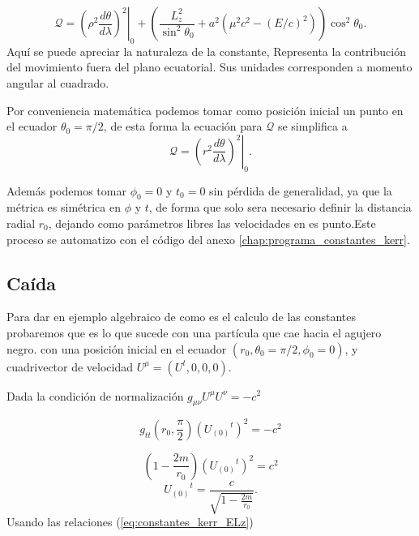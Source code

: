 \begin{equation}
    \mathcal{Q}=\left.\left(\rho^2 \frac{d \theta}{d \lambda}\right)^2\right|_0 +\left(\frac{L_z^2}{\sin ^2 \theta_0}+a^2\left(\mu^2 c^2-(E/c)^2\right)\right) \cos ^2 \theta_0 .
\end{equation}
Aquí se puede apreciar la naturaleza de la constante, Representa la contribución del movimiento fuera del plano ecuatorial. Sus unidades corresponden a momento angular al cuadrado.

Por conveniencia matemática podemos tomar como posición inicial un punto en el ecuador $\theta_0=\pi / 2$, de esta forma la ecuación para $\mathcal{Q}$ se simplifica a
\begin{equation}
    \mathcal{Q}=\left.\left(r^2 \frac{d \theta}{d \lambda}\right)^2\right|_0  .
\end{equation}

Además podemos tomar $\phi_0=0$ y $t_0=0$ sin pérdida de generalidad, ya que la métrica es simétrica en $\phi$ y $t$, de forma que solo sera necesario definir la distancia radial $r_0$, dejando como parámetros libres las velocidades en es punto.Este proceso se automatizo con el código del anexo \ref{chap:programa_constantes_kerr}.


\subsection{Caída }
Para dar en ejemplo algebraico de como es el calculo de las constantes probaremos que es lo que sucede con una partícula que cae hacia el agujero negro. con una posición inicial en el ecuador $(r_0, \theta_0=\pi/2, \phi_0=0)$, y cuadrivector de velocidad $U^\mu = (U^t, 0, 0, 0 )$.

Dada la condición de normalización $g_{\mu \nu} U^\mu U^\nu=-c^2$

\begin{equation}
    g_{t t}\left(r_0, \frac{\pi}{2}\right)\left({U_{(0)}}^t\right)^2=-c^2
\end{equation}


\begin{equation}
    \left(1-\frac{2 m }{r_0}\right)\left({U_{(0)}}^t\right)^2=c^2
\end{equation}
\begin{equation}
    {U_{(0)}}^t = \frac{c}{\sqrt{1-\frac{2 m }{r_0}}}.
\end{equation}
Usando las relaciones (\ref{eq:constantes_kerr_ELz})

